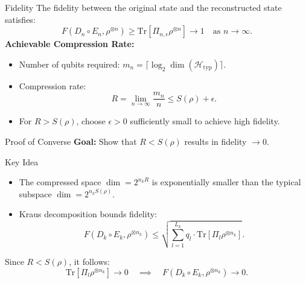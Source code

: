 \begin{frame}{Fidelity}
    The fidelity between the original state and the reconstructed state satisfies:
    \[
    F(D_n \circ E_n, \rho^{\otimes n}) \geq \text{Tr}[\Pi_{n, \epsilon} \rho^{\otimes n}] \to 1 \quad \text{as } n \to \infty.
    \]
    \textbf{Achievable Compression Rate:}
    \begin{itemize}
        \item Number of qubits required: \( m_n = \lceil \log_2 \dim(\mathcal{H}_{\text{typ}}) \rceil \).
        \item Compression rate:
        \[
        R = \lim_{n \to \infty} \frac{m_n}{n} \leq S(\rho) + \epsilon.
        \]
        \item For \( R > S(\rho) \), choose \( \epsilon > 0 \) sufficiently small to achieve high fidelity.
    \end{itemize}
\end{frame}

\begin{frame}{Proof of Converse}
    \textbf{Goal:} Show that \( R < S(\rho) \) results in fidelity \( \to 0 \).
    \begin{block}{Key Idea}
        \begin{itemize}
            \item The compressed space \( \dim = 2^{n_k R} \) is exponentially smaller than the typical subspace \( \dim = 2^{n_k S(\rho)} \).
            \item Kraus decomposition bounds fidelity:
            \[
            F(D_k \circ E_k, \rho^{\otimes n_k}) \leq \sqrt{\sum_{l=1}^{L_k} q_l \cdot \text{Tr}[\Pi_l \rho^{\otimes n_k}]}.
            \]
        \end{itemize}
    \end{block}
    Since \( R < S(\rho) \), it follows:
    \[
    \text{Tr}[\Pi_l \rho^{\otimes n_k}] \to 0 \quad \implies \quad F(D_k \circ E_k, \rho^{\otimes n_k}) \to 0.
    \]
\end{frame}
